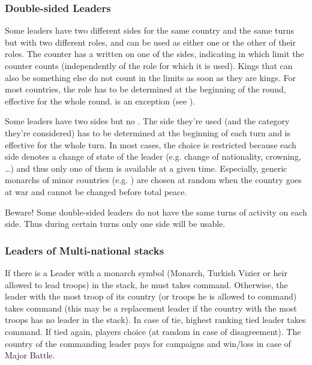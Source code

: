 \subsubsection{Double-sided Leaders}\label{chMilitary:Double Sided Leaders}
\aparag Some leaders have two different sides for the same country and the
same turns but with two different roles, and can be used as either one or the
other of their roles.
\bparag The counter has a {\textetoile} written on one of the sides,
indicating in which limit the counter counts (independently of the role
for which it is used).
\bparag Kings that can also be something else do not count in the limits
as soon as they are kings.
\bparag For most countries, the role has to be determined at the
beginning of the round, effective for the whole round. \POR is an
exception (see ).

\aparag Some leaders have two sides but no {\textetoile}.
\bparag The side they're used (and the category they're considered) has
to be determined at the beginning of each turn and is effective for the
whole turn.
\bparag In most cases, the choice is restricted because each side
denotes a change of state of the leader (e.g. change of nationality,
crowning, \ldots) and thus only one of them is available at a given
time.
\bparag Especially, generic monarchs of minor countries
(e.g. \leaderShah) are chosen at random when the country goes at war and
cannot be changed before total peace.

\aparag Beware! Some double-sided leaders do not have the same turns of
activity on each side. Thus during certain turns only one side will be
usable.

\subsubsection{Leaders of Multi-national stacks}\label{chMilitary:multi national}
\aparag[On land]
\bparag If there is a Leader with a monarch symbol (Monarch, Turkish Vizier or
heir allowed to lead troops) in the stack, he must takes command.
\bparag Otherwise, the leader with the most troop of its country (or troops he
is allowed to command) takes command (this may be a replacement leader if the
country with the most troops has no leader in the stack).
\bparag In case of tie, highest ranking tied leader takes command.
\bparag If tied again, players choice (at random in case of disagreement).
\bparag The country of the commanding leader pays for campaigns and win/loss
\STAB in case of Major Battle.

